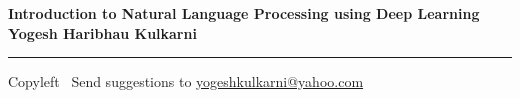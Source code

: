 
\graphicspath{{images/}}

\footnotesize


\begin{center}
\Large{\textbf{Introduction to Natural Language Processing using Deep Learning\\ Yogesh Haribhau Kulkarni}}  
\end{center}

\begin{multicols}{2}

\end{multicols}

\rule{\linewidth}{0.25pt}
\scriptsize
Copyleft \textcopyleft\  Send suggestions to 
\href{http://www.yogeshkulkarni.com}{yogeshkulkarni@yahoo.com}


